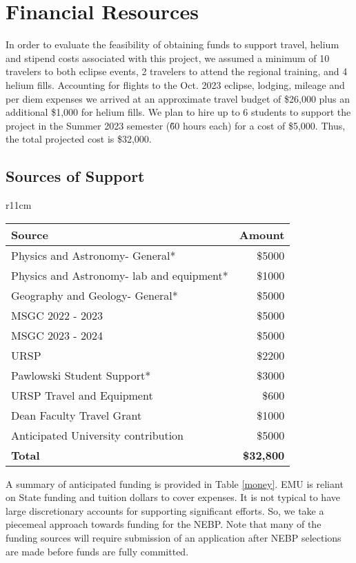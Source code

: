 \documentclass[12pt]{article}
\begin{document}
\newpage

\section{Financial Resources}
\vspace{-.15in}
In order to evaluate the feasibility of obtaining funds to support travel,
helium and stipend costs associated with this project, we
assumed a minimum of 10 travelers to both eclipse events, 2 travelers
to attend the regional training, and 4 helium fills. Accounting for 
flights to the Oct. 2023 eclipse, lodging, mileage and per diem expenses we 
arrived at an approximate travel budget of \$26,000
plus an additional \$1,000 for helium fills.
We plan to hire up to
6 students to support the project in the Summer 2023 semester (\~ 60 hours each) 
for a cost of \$5,000.
Thus, the total projected cost is \$32,000.

\vspace{-.1in}
\subsection{Sources of Support}
\vspace{-.1in}
\begin{wraptable}{r}{11cm}
  \vspace{-.2in}

  \centering
  \begin{tabular}{|l|r|}
  \hline
  Source&Amount\\
  \hline
  Physics and Astronomy- General*&\$5000\\
  Physics and Astronomy- lab and equipment*&\$1000\\
  Geography and Geology- General*&\$5000\\
  MSGC 2022 - 2023&\$5000\\
  MSGC 2023 - 2024&\$5000\\
  URSP&\$2200\\
  Pawlowski Student Support*& \$3000\\
  URSP Travel and Equipment&\$600\\
  Dean Faculty Travel Grant&\$1000\\
  Anticipated University contribution&\$5000\\
  \hline
  {\bf Total}&{\bf \$32,800}\\
  \hline
  \end{tabular}
  \caption{\small Anticipated sources of financial support for travel\\ and equipment. * 
  indicates funds are already committed.}
  \label{money}
  \vspace{-.2in}
  \end{wraptable}
A summary of anticipated funding is provided in Table \ref{money}.
EMU is reliant on State funding and tuition dollars to cover expenses. It is 
not typical to have large discretionary accounts for supporting significant efforts. 
So, we take a piecemeal
approach towards funding for the NEBP. Note that many of the funding sources will 
require submission of an application after NEBP selections are made before funds are fully 
committed.
\end{document}
